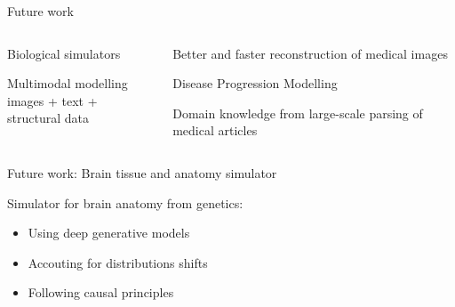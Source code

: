 \documentclass[8pt,xcolor=table]{beamer}
\begin{document}
\begin{frame}{Future work}


\vspace{-2em}
\begin{columns}[t]
\begin{column}{0.5\textwidth}
\centering

Biological simulators\\

\vt
\vt

Multimodal modelling\\
images + text + structural data  

\end{column}
\begin{column}{0.5\textwidth}
\centering

Better and faster reconstruction of medical images\\

\vo

Disease Progression Modelling

\vo

Domain knowledge from large-scale parsing of medical articles\\

\end{column}
\end{columns}


\end{frame}


\begin{frame}{Future work: Brain tissue and anatomy simulator}


Simulator for brain anatomy from genetics:
\begin{itemize}
 \item Using deep generative models
 \item Accouting for distributions shifts
 \item Following causal principles
\end{itemize}

\vt


\end{frame}
\end{document}
